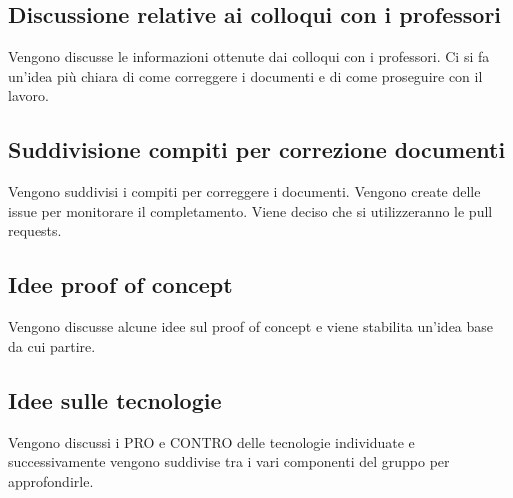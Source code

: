 \subsection*{Discussione relative ai colloqui con i professori}
Vengono discusse le informazioni ottenute dai colloqui con i professori. Ci si fa un'idea più chiara di come correggere i documenti e di come proseguire con il lavoro.
\subsection*{Suddivisione compiti per correzione documenti}
Vengono suddivisi i compiti per correggere i documenti. Vengono create delle issue per monitorare il completamento. Viene deciso che si utilizzeranno le pull requests.
\subsection*{Idee proof of concept}
Vengono discusse alcune idee sul proof of concept e viene stabilita un'idea base da cui partire.
\subsection*{Idee sulle tecnologie}
Vengono discussi i PRO e CONTRO delle tecnologie individuate e successivamente vengono suddivise tra i vari componenti del gruppo per approfondirle.
